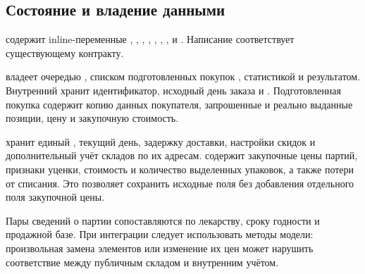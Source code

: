 \subsection{Состояние и владение данными}
 содержит inline-переменные ,
, , , ,
, ,  и .
Написание  соответствует существующему контракту.

 владеет очередью , списком подготовленных
покупок , статистикой и результатом. Внутренний 
хранит идентификатор, исходный день заказа и . Подготовленная покупка
содержит копию данных покупателя, запрошенные и реально выданные позиции,
цену и закупочную стоимость.

 хранит единый , текущий день,
задержку доставки, настройки скидок и дополнительный учёт складов по их адресам.
 содержит закупочные цены партий, признаки уценки,
стоимость и количество выделенных упаковок, а также потери от списания.
Это позволяет сохранить исходные поля  без добавления
отдельного поля закупочной цены.

Пары сведений о партии сопоставляются по лекарству, сроку годности и продажной
базе. При интеграции следует использовать методы модели: произвольная замена
элементов  или изменение их цен может нарушить соответствие
между публичным складом и внутренним учётом.
